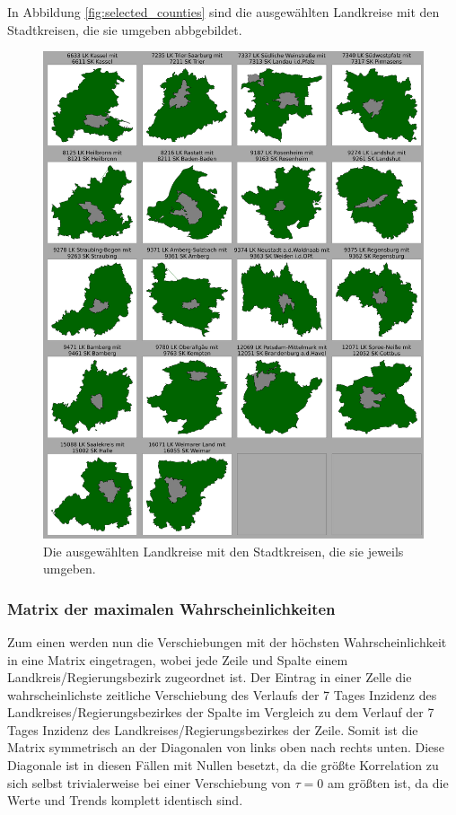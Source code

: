 In Abbildung \autoref{fig:selected_counties} sind die ausgewählten Landkreise mit den Stadtkreisen, die sie umgeben abbgebildet.
\begin{figure}
    \centering
    \includegraphics[width=\textwidth]{figures/Durchführung/selected_counties.png}
    \caption{Die ausgewählten Landkreise mit den Stadtkreisen, die sie jeweils umgeben.}
    \label{fig:selected_counties}
\end{figure}

\subsubsection{Matrix der maximalen Wahrscheinlichkeiten}
Zum einen werden nun die Verschiebungen mit der höchsten Wahrscheinlichkeit in eine Matrix eingetragen, wobei jede Zeile und Spalte einem Landkreis/Regierungsbezirk zugeordnet ist. 
Der Eintrag in einer Zelle die wahrscheinlichste zeitliche Verschiebung des Verlaufs der 7 Tages Inzidenz des Landkreises/Regierungsbezirkes der Spalte im Vergleich zu dem Verlauf der 7 Tages Inzidenz des Landkreises/Regierungsbezirkes der Zeile.
Somit ist die Matrix symmetrisch an der Diagonalen von links oben nach rechts unten. Diese Diagonale ist in diesen Fällen mit Nullen besetzt, da die größte Korrelation zu sich selbst trivialerweise bei einer Verschiebung von $\tau=0$ am größten ist, da die Werte und Trends komplett identisch sind.

